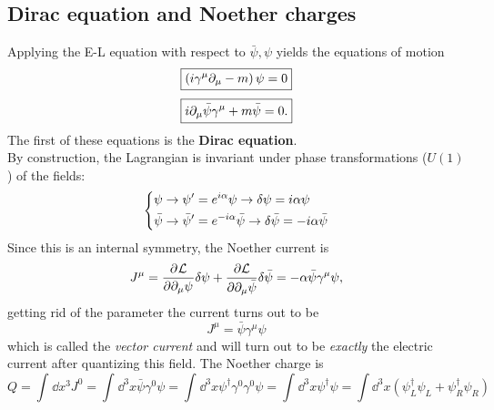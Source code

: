 \subsection{Dirac equation and Noether charges}
Applying the E-L equation with respect to $\bar\psi,\psi$ yields the equations
of motion
$$\boxed{\left(i\gamma^\mu\partial_\mu-m\right)\psi = 0}$$
$$\boxed{i\partial_\mu\bar\psi\gamma^\mu+m\bar\psi = 0.}$$
The first of these equations is the \textbf{Dirac equation}.\\
By construction, the Lagrangian is invariant under phase transformations ($U(1)$)
of the fields:
$$\begin{dcases*}
  \psi\rightarrow\psi'=e^{i\alpha}\psi\to\delta\psi = i\alpha\psi\\
  \bar\psi\rightarrow\bar\psi'=e^{-i\alpha}\bar\psi\to\delta\bar\psi =
  -i\alpha\bar\psi
  \end{dcases*}$$
Since this is an internal symmetry, the Noether current is
$$J^\mu = \pdv[]{\mathcal{L}}{\partial_\mu\psi}\delta\psi +
\pdv{\mathcal{L}}{\partial_\mu\bar\psi}\delta\bar\psi=-\alpha\bar\psi\gamma^\mu\psi,$$
getting rid of the parameter the current turns out to be
$$J^\mu = \bar\psi\gamma^\mu\psi$$
which is called the \textit{vector current} and will turn out to be
\textit{exactly} the electric current after quantizing this field.
The Noether charge is
$$Q = \int_{}^{}\dd x^3J^0 = \int_{}^{}\dd^3x \bar\psi\gamma^0\psi = \int_{}^{}
\dd^3x\psi^\dagger\gamma^0\gamma^0\psi  =\int_{}^{}\dd^3x\psi^\dagger\psi=
\int\dd^3x\left(\psi_L^\dagger\psi_L+\psi_R^\dagger\psi_R\right)$$
